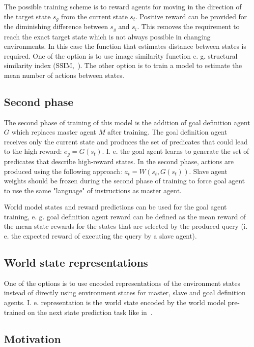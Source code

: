 \documentclass{article}
\begin{document}
The possible training scheme is to reward agents for moving in the direction of the target state $s_g$ from the current state $s_t$. Positive reward can be provided for the diminishing difference between $s_g$ and $s_t$. This removes the requirement to reach the exact target state which is not always possible in changing environments. In this case the function that estimates distance between states is required. One of the option is to use image similarity function e. g. structural similarity index (SSIM,~\citep{Wang2004ImageQA}). The other option is to train a model to estimate the mean number of actions between states.

\subsection{Second phase}

The second phase of training of this model is the addition of goal definition agent $G$ which replaces master agent $M$ after training. The goal definition agent receives only the current state and produces the set of predicates that could lead to the high reward: $e_g = G(s_t)$. I. e. the goal agent learns to generate the set of predicates that describe high-reward states. In the second phase, actions are produced using the following approach: $a_t = W(s_t, G(s_t))$. Slave agent weights should be frozen during the second phase of training to force goal agent to use the same "language" of instructions as master agent.

World model states and reward predictions can be used for the goal agent training, e. g. goal definition agent reward can be defined as the mean reward of the mean state rewards for the states that are selected by the produced query (i. e. the expected reward of executing the query by a slave agent).


\subsection{World state representations}

One of the options is to use encoded representations of the environment states instead of directly using environment states for master, slave and goal definition agents. I. e. representation is the world state encoded by the world model pre-trained on the next state prediction task like in~\citep{Ha2018RecurrentWM}.

\subsection{Motivation}
\end{document}

